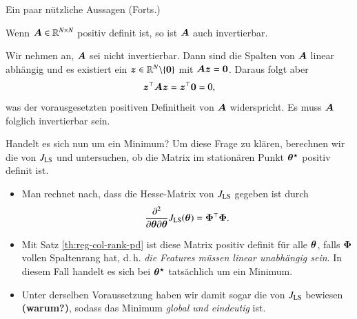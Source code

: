 \begin{frame}{Ein paar nützliche Aussagen (Forts.)}{}
	\begin{mytheo}
		Wenn $\bm{A} \in \mathbb{R}^{N \times N}$ positiv definit ist, so ist $\bm{A}$ auch invertierbar.
	\end{mytheo}
	
	\begin{myproof}
		Wir nehmen an, $\bm{A}$ sei nicht invertierbar. Dann sind die Spalten von $\bm{A}$ linear abhängig und es existiert ein
		$\bm{z} \in \mathbb{R}^N \backslash \{ \bm{0} \}$ mit $\bm{A} \bm{z} = \bm{0}$.
		Daraus folgt aber $$\bm{z}^\top \bm{A} \bm{z} = \bm{z}^\top \bm{0} = 0,$$ was der vorausgesetzten positiven Definitheit von $\bm{A}$ widerspricht.
		Es muss $\bm{A}$ folglich invertierbar sein.
	\end{myproof}
\end{frame}


\begin{frame}{Handelt es sich nun um ein Minimum?}{}
	Um diese Frage zu klären, berechnen wir die  von $J_{\text{LS}}$ und untersuchen,
	ob die Matrix im stationären Punkt $\bm{\theta}^\star$ positiv definit ist.

	\begin{itemize}
		\item Man rechnet nach, dass die Hesse-Matrix von $J_{\text{LS}}$ gegeben ist durch
			$$\frac{\partial^2}{\partial \bm{\theta} \partial \bm{\theta}} J_{\text{LS}}(\bm{\theta}) = \bm{\Phi}^\top \bm{\Phi}.$$
		\item Mit Satz \ref{th:reg-col-rank-pd} ist diese Matrix positiv definit für alle $\bm{\theta}$, falls $\bm{\Phi}$ vollen Spaltenrang hat,
			d.\,h. \textit{die Features müssen linear unabhängig sein}.
			In diesem Fall handelt es sich bei $\bm{\theta}^\star$ tatsächlich um ein Minimum.
		\item Unter derselben Voraussetzung haben wir damit sogar die  von $J_{\text{LS}}$ bewiesen \textbf{(warum?)},
			sodass das Minimum \textit{global und eindeutig} ist.
	\end{itemize}
\end{frame}


